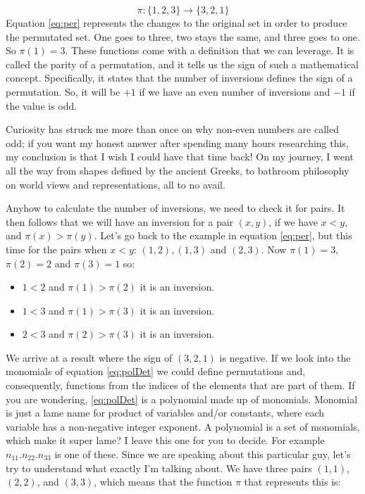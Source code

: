 \documentclass[600paper, 11pt,twoside,openany]{kdp}
\begin{document}
\begin{equation}\label{eq:per}
\pi:\lbrace 1,2,3 \rbrace \rightarrow \lbrace 3,2,1 \rbrace
\end{equation}
\indent Equation \ref{eq:per} represents the changes to the original set in order to produce the permutated set. One goes to three, two stays the same, and three goes to one. So $\pi(1) = 3$. These functions come with a definition that we can leverage. It is called the parity of a permutation, and it tells us the sign of such a mathematical concept. Specifically, it states that the number of inversions defines the sign of a permutation. So, it will be $+1$ if we have an even number of inversions and $-1$ if the value is odd. 
\par 
\vspace{-3pt}
\indent Curiosity has struck me more than once on why non-even numbers are called odd; if you want my honest answer after spending many hours researching this, my conclusion is that I wish I could have that time back! On my journey, I went all the way from shapes defined by the ancient Greeks, to bathroom philosophy on world views and representations, all to no avail. 
\par 
\vspace{-3pt}
\indent Anyhow to calculate the number of inversions, we need to check it for pairs. It then follows that we will have an inversion for a pair $(x,y)$, if we have $x<y$, and $\pi(x)>\pi(y)$. Let’s go back to the example in equation \ref{eq:per}, but this time for the pairs when $x<y$: $(1,2),(1,3)$ and $(2,3)$. Now $\pi(1)=3$, $\pi(2)=2$ and $\pi(3)=1$ so:
\begin{tcolorbox}
\begin{itemize}
\item $1<2$ and $\pi(1) > \pi(2)$ it is an inversion.
\item $1<3$ and $\pi(1) > \pi(3)$ it is an inversion.
\item $2< 3$ and $\pi(2) > \pi(3)$ it is an inversion.
\end{itemize}
\end{tcolorbox}
\par 
\vspace{-3pt}
\indent We arrive at a result where the sign of $(3,2,1)$ is negative. If we look into the monomials of equation \ref{eq:polDet} we could define permutations and, consequently, functions from the indices of the elements that are part of them. If you are wondering, \ref{eq:polDet} is a polynomial made up of monomials. Monomial is just a lame name for product of variables and/or constants, where each variable has a non-negative integer exponent. A polynomial is a set of monomials, which make it super lame? I leave this one for you to decide. For example $n_{11}.n_{22}.n_{33}$  is one of these. Since we are speaking about this particular guy, let’s try to understand what exactly I’m talking about. We have three pairs $(1,1)$, $(2,2)$, and $(3,3)$, which means that the function $\pi$ that represents this is:
\end{document}
